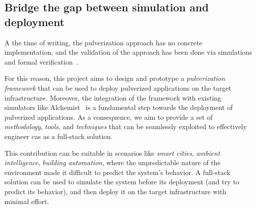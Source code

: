 \documentclass[12pt]{article}
\newcommand{\meta}[1]{{\color{blue}#1}}
\begin{document}
\subsection{Bridge the gap between simulation and deployment}\label{sec:bridge-gap}
\meta{
A the time of writing,
the pulverization approach has no concrete implementation,
and the validation of the approach has been done via simulations and formal verification~\cite{DBLP:journals/fi/CasadeiPPVW20, DBLP:journals/iotj/CasadeiFPPSV22}.

For this reason,
this project aims to design and prototype a \emph{pulverization framework} that can be used to deploy pulverized applications on the target infrastructure.
%
Moreover,
the integration of the framework with existing simulators like Alchemist~\cite{DBLP:journals/jos/PianiniMV13} is a fundamental step towards the deployment of pulverized applications.
%
As a consequence,
we aim to provide a set of \emph{methodology},
\emph{tools},
and \emph{techniques} that can be seamlessly exploited to effectively engineer \ac{cas} as a full-stack solution.

This contribution can be suitable in scenarios like \emph{smart cities},
\emph{ambient intelligence},
\emph{building automation},
where the unpredictable nature of the environment made it difficult to predict the system's behavior.
%
A full-stack solution can be used to simulate the system before its deployment (and try to predict its behavior),
and then deploy it on the target infrastructure with minimal effort.
}
\end{document}
